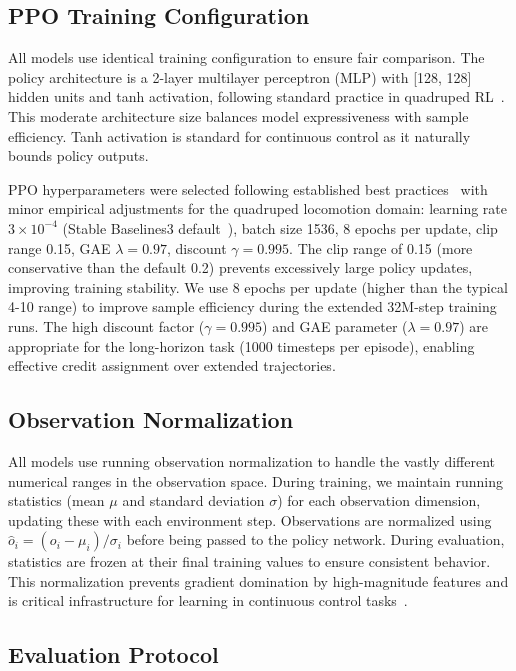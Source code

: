 \documentclass[conference]{IEEEtran}
\begin{document}
\subsection{PPO Training Configuration}

All models use identical training configuration to ensure fair comparison. The policy architecture is a 2-layer multilayer perceptron (MLP) with [128, 128] hidden units and tanh activation, following standard practice in quadruped RL~\cite{hwangbo2019learning}. This moderate architecture size balances model expressiveness with sample efficiency. Tanh activation is standard for continuous control as it naturally bounds policy outputs.

PPO hyperparameters were selected following established best practices~\cite{huang2022ppo} with minor empirical adjustments for the quadruped locomotion domain: learning rate $3 \times 10^{-4}$ (Stable Baselines3 default~\cite{openai2018baselines}), batch size 1536, 8 epochs per update, clip range 0.15, GAE $\lambda=0.97$, discount $\gamma=0.995$. The clip range of 0.15 (more conservative than the default 0.2) prevents excessively large policy updates, improving training stability. We use 8 epochs per update (higher than the typical 4-10 range) to improve sample efficiency during the extended 32M-step training runs. The high discount factor ($\gamma=0.995$) and GAE parameter ($\lambda=0.97$) are appropriate for the long-horizon task (1000 timesteps per episode), enabling effective credit assignment over extended trajectories.

\subsection{Observation Normalization}

All models use running observation normalization to handle the vastly different numerical ranges in the observation space. During training, we maintain running statistics (mean $\mu$ and standard deviation $\sigma$) for each observation dimension, updating these with each environment step. Observations are normalized using $\hat{o}_i = (o_i - \mu_i) / \sigma_i$ before being passed to the policy network. During evaluation, statistics are frozen at their final training values to ensure consistent behavior. This normalization prevents gradient domination by high-magnitude features and is critical infrastructure for learning in continuous control tasks~\cite{openai2018baselines,andrychowicz2021matters}.

\subsection{Evaluation Protocol}
\end{document}

